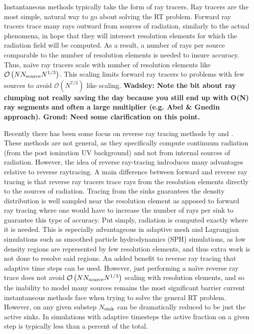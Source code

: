 \documentclass[fleq,usenatbib]{mnras}
\newcommand{\bigO}[1]{\mathcal{O}\left(#1\right)}
\newcommand{\comment}[1]{\textbf{\color{red}#1}}
\newcommand{\NS}{N_{\rm source}}
\begin{document}
Instantaneous methods typically take the form of ray tracers. Ray tracers are 
the most simple, natural way to go about solving the RT problem. Forward ray 
tracers trace many rays outward from sources of radiation, similarly to the 
actual phenomena, in hope that they will intersect resolution elements for 
which the radiation field will be computed. As a result, a number of rays per 
source comparable to the number of resolution elements is needed to insure 
accuracy. Thus, na\"ive ray tracers scale with number of resolution elements 
like $\bigO{N \NS N^{1/3}}$. This scaling limits forward ray tracers to 
problems with few sources to avoid $\mathcal{O}(N^{7/3})$ like scaling. 
\comment{Wadsley: Note the bit about ray clumping not really saving 
the day because you still end up with O(N) ray segments and often a large 
multiplier (e.g. Abel \& Gnedin approach). Grond: Need some clarification on 
this point.}

Recently there has been some focus on reverse ray tracing methods by
\cite{clarkEt12} and \cite{altayTheuns13}. These methods are not general, 
as they specifically compute continuum radiation (from the post ionization UV 
background) and not from internal sources of radiation. However, the idea of 
reverse ray-tracing indroduces many advantages relative to reverse raytracing.
A main difference between forward and 
reverse ray tracing is that reverse ray tracers trace rays from the resolution 
elements directly to the sources of radiation. Tracing from the sinks 
guarantees the density distribution is well sampled near the resolution 
element as apposed to forward ray tracing where one would have to increase the 
number of rays per sink to guarantee this type of accuracy. Put simply, 
radiation is computed exactly where it is needed. This is especially 
advantageous in adaptive mesh and Lagrangian simulations such as smoothed 
particle hydrodynamics (SPH) simulations, as low density regions are 
represented by few resolution elements, and thus extra work is not done to 
resolve said regions. An added benefit to reverse ray tracing that adaptive 
time steps can be used. However, just performing a na\"ive reverse ray trace 
does not avoid $\bigO{N \NS N^{1/3}}$ scaling with resolution elements, and 
so the inability to model many sources remains the most significant barrier 
current instantaneous methods face when trying to solve the general RT 
problem. However, on any given substep $N_{\rm sink}$ can be dramatically 
reduced to be just the active sinks. In simulations with adaptive timesteps 
the active fraction on a given step is typically less than a percent of the 
total.
\end{document}

